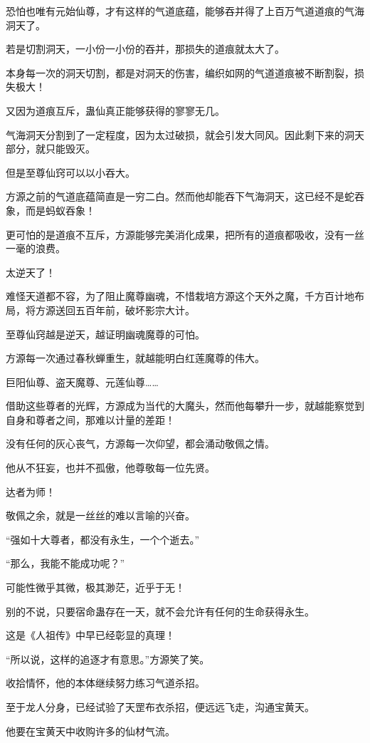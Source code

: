 \begin{this_body}
恐怕也唯有元始仙尊，才有这样的气道底蕴，能够吞并得了上百万气道道痕的气海洞天了。

若是切割洞天，一小份一小份的吞并，那损失的道痕就太大了。

本身每一次的洞天切割，都是对洞天的伤害，编织如网的气道道痕被不断割裂，损失极大！

又因为道痕互斥，蛊仙真正能够获得的寥寥无几。

气海洞天分割到了一定程度，因为太过破损，就会引发大同风。因此剩下来的洞天部分，就只能毁灭。

但是至尊仙窍可以以小吞大。

方源之前的气道底蕴简直是一穷二白。然而他却能吞下气海洞天，这已经不是蛇吞象，而是蚂蚁吞象！

更可怕的是道痕不互斥，方源能够完美消化成果，把所有的道痕都吸收，没有一丝一毫的浪费。

太逆天了！

难怪天道都不容，为了阻止魔尊幽魂，不惜栽培方源这个天外之魔，千方百计地布局，将方源送回五百年前，破坏影宗大计。

至尊仙窍越是逆天，越证明幽魂魔尊的可怕。

方源每一次通过春秋蝉重生，就越能明白红莲魔尊的伟大。

巨阳仙尊、盗天魔尊、元莲仙尊……

借助这些尊者的光辉，方源成为当代的大魔头，然而他每攀升一步，就越能察觉到自身和尊者之间，那难以计量的差距！

没有任何的灰心丧气，方源每一次仰望，都会涌动敬佩之情。

他从不狂妄，也并不孤傲，他尊敬每一位先贤。

达者为师！

敬佩之余，就是一丝丝的难以言喻的兴奋。

“强如十大尊者，都没有永生，一个个逝去。”

“那么，我能不能成功呢？”

可能性微乎其微，极其渺茫，近乎于无！

别的不说，只要宿命蛊存在一天，就不会允许有任何的生命获得永生。

这是《人祖传》中早已经彰显的真理！

“所以说，这样的追逐才有意思。”方源笑了笑。

收拾情怀，他的本体继续努力练习气道杀招。

至于龙人分身，已经试验了天罡布衣杀招，便远远飞走，沟通宝黄天。

他要在宝黄天中收购许多的仙材气流。


\end{this_body}
